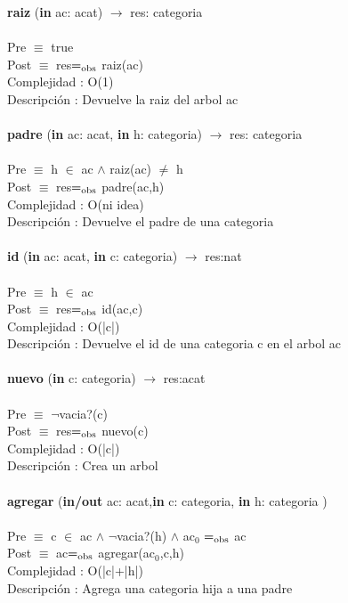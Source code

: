 \documentclass[10pt, a4paper]{article}
\begin{document}
	\textbf{raiz} (\textbf{in} ac: acat) $\longrightarrow$ res: categoria\\\\
	Pre $\equiv$ {true}\\
	Post $\equiv$ {res$=_{\mathrm{obs}}$ raiz(ac)}\\
	Complejidad : O(1)\\
	Descripci\'{o}n : Devuelve la raiz del arbol ac\\\\
	
	\textbf{padre} (\textbf{in} ac: acat, \textbf{in} h: categoria) $\longrightarrow$ res: categoria\\\\
	Pre $\equiv$ {h $\in$ ac $\wedge$ raiz(ac) $\neq$ h}\\
	Post $\equiv$ {res$=_{\mathrm{obs}}$ padre(ac,h)}\\
	Complejidad : O(ni idea)\\
	Descripci\'{o}n : Devuelve el padre de una categoria\\\\
		
	\textbf{id} (\textbf{in} ac: acat, \textbf{in} c: categoria) $\longrightarrow$ res:nat\\\\
	Pre $\equiv$ {h $\in$ ac}\\
	Post $\equiv$ {res$=_{\mathrm{obs}}$ id(ac,c)}\\
	Complejidad : O(|c|)\\
	Descripci\'{o}n : Devuelve el id de una categoria c en el arbol ac\\\\	
	
	\textbf{nuevo} (\textbf{in} c: categoria) $\longrightarrow$ res:acat\\\\
	Pre $\equiv$ {$¬$vacia?(c)}\\
	Post $\equiv$ {res$=_{\mathrm{obs}}$ nuevo(c)}\\
	Complejidad : O(|c|)\\
	Descripci\'{o}n : Crea un arbol\\\\	
	
	\textbf{agregar} (\textbf{in/out} ac: acat,\textbf{in} c: categoria, \textbf{in} h: categoria )\\\\
	Pre $\equiv$ {c $\in$ ac $\wedge$ $¬$vacia?(h) $\wedge$ ac${_0}$ $=_{\mathrm{obs}}$ ac}\\
	Post $\equiv$ {ac$=_{\mathrm{obs}}$ agregar(ac${_0}$,c,h)}\\
	Complejidad : O(|c|+|h|)\\
	Descripci\'{o}n : Agrega una categoria hija a una padre\\\\
	
\end{document}
